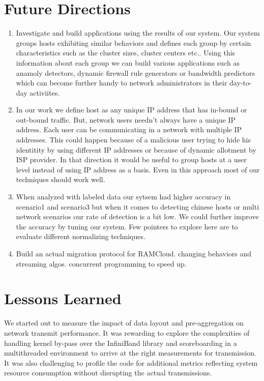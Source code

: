 \section{Future Directions}

\begin{enumerate}
	\item Investigate and build applications using the results of our system. Our system groups hosts exhibiting similar behaviors and defines each group by certain characteristics such as the cluster sizes, cluster centers etc.. Using this information about each group we can build various applications such as anamoly detectors, dynamic firewall rule generators or bandwidth predictors which can become further handy to network administrators in their day-to-day activiites.
	
	\item In our work we define host as any unique IP address that has in-bound or out-bound traffic. But, network users needn't always have a unique IP address. Each user can be communicating in a network with multiple IP addresses. This could happen because of a malicious user trying to hide his identitity by using different IP addresses or because of dynamic allotment by ISP provider. In that direction it would be useful to group hosts at a user level instead of using IP address as a basis. Even in this approach most of our techniques should work well. 
	
	\item When analyzed with labeled data our sytsem had higher accuracy in scenario1 and scenario3 but when it comes to detecting chinese hosts or multi network scenarios our rate of detection is a bit low. We could further improve the accuracy by tuning our system. Few pointers to explore here are to evaluate different normalizing techniques.
	
	\item Build an actual migration protocol for RAMCloud. changing behaviors and streaming algos.	 concurrent programming to speed up.
\end{enumerate}

\section{Lessons Learned}
We started out to measure the impact of data layout and pre-aggregation on network transmit performance. 
It was rewarding to explore the complexities of handling kernel by-pass over the InfiniBand library and 
scoreboarding in a multithreaded environment to arrive at the right measurements for transmission.
It was also challenging to profile the code for additional metrics reflecting system resource consumption 
without disrupting the actual transmissions. 


